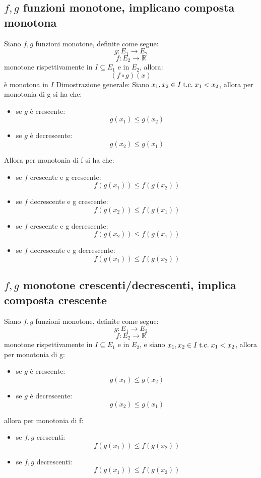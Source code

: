 \documentclass[a4paper,12pt,openright]{book}
\begin{document}
	\subsection{$f, g$ funzioni monotone, implicano composta monotona}
	Siano $f, g$ funzioni monotone, definite come segue:
	\[g: E_1 \longrightarrow E_2\]
	\[f: E_2 \longrightarrow \mathbb{R}\]
	monotone rispettivamente in $I \subseteq E_1$ e in $E_2$, allora:
	\[(f \circ g)(x)\]
	è monotona in $I$ \newline
	Dimostrazione generale:
	Siano $x_1, x_2 \in I \;\text{t.c.}\; x_1 < x_2$, allora per monotonia di g si ha che:
	\begin{itemize}
		\item se $g$ è crescente:
		\[g(x_1) \leq g(x_2)\]
		
		\item se $g$ è decrescente:
		\[g(x_2) \leq g(x_1)\]
	\end{itemize}
	Allora per monotonia di f si ha che:
	\begin{itemize}
		\item se $f$ crescente e g crescente:
		\[f(g(x_1)) \leq f(g(x_2))\]
		\item se $f$ decrescente e g crescente:
		\[f(g(x_2)) \leq f(g(x_1))\] 
		\item se $f$ crescente e g decrescente:
		\[f(g(x_2)) \leq f(g(x_1))\]
		\item se $f$ decrescente e g decrescente:
		\[f(g(x_1)) \leq f(g(x_2))\] 
	\end{itemize}
	\newpage
	\subsection{$f, g$ monotone crescenti/decrescenti, implica composta crescente}
	Siano $f, g$ funzioni monotone, definite come segue:
	\[g: E_1 \longrightarrow E_2\]
	\[f: E_2 \longrightarrow \mathbb{R}\]
	monotone rispettivamente in $I \subseteq E_1$ e in $E_2$, e siano $x_1, x_2 \in I \;\text{t.c.}\; x_1 < x_2$, allora per monotonia di g:
	\begin{itemize}
		\item se $g$ è crescente:
		\[g(x_1) \leq g(x_2)\]
		
		\item se $g$ è decrescente:
		\[g(x_2) \leq g(x_1)\]
	\end{itemize}
	allora per monotonia di f:
	\begin{itemize}
		\item se $f, g$ crescenti:
		\[f(g(x_1)) \leq f(g(x_2))\]
		
		\item se $f, g$ decrescenti:
		\[f(g(x_1)) \leq f(g(x_2))\]
	\end{itemize}
	
\end{document}
